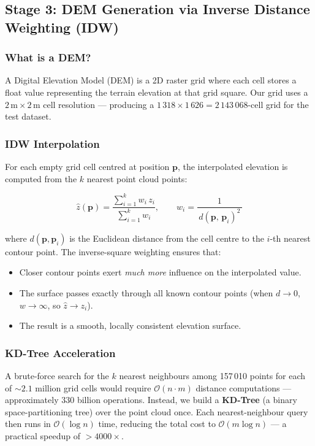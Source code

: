 \documentclass[12pt,a4paper]{article}
\begin{document}
\subsection{Stage 3: DEM Generation via Inverse Distance Weighting (IDW)}

\subsubsection{What is a DEM?}
A Digital Elevation Model (DEM) is a 2D raster grid where each cell stores a float
value representing the terrain elevation at that grid square. Our grid uses a
$2\,\text{m} \times 2\,\text{m}$ cell resolution --- producing a
$1\,318 \times 1\,626 = 2\,143\,068$-cell grid for the test dataset.

\subsubsection{IDW Interpolation}
For each empty grid cell centred at position $\mathbf{p}$, the interpolated elevation
is computed from the $k$ nearest point cloud points:

\begin{equation}
    \hat{z}(\mathbf{p}) = \frac{\displaystyle\sum_{i=1}^{k} w_i \, z_i}
                               {\displaystyle\sum_{i=1}^{k} w_i},
    \qquad w_i = \frac{1}{\,d(\mathbf{p},\,\mathbf{p}_i)^2\,}
\end{equation}

where $d(\mathbf{p}, \mathbf{p}_i)$ is the Euclidean distance from the cell centre to
the $i$-th nearest contour point. The inverse-square weighting ensures that:
\begin{itemize}
    \item Closer contour points exert \emph{much more} influence on the interpolated value.
    \item The surface passes exactly through all known contour points (when $d \to 0$,
          $w \to \infty$, so $\hat{z} \to z_i$).
    \item The result is a smooth, locally consistent elevation surface.
\end{itemize}

\subsubsection{KD-Tree Acceleration}
A brute-force search for the $k$ nearest neighbours among 157\,010 points for each of
$\sim 2.1$ million grid cells would require $\mathcal{O}(n \cdot m)$ distance
computations --- approximately $330$ billion operations. Instead, we build a
\textbf{KD-Tree} (a binary space-partitioning tree) over the point cloud once. Each
nearest-neighbour query then runs in $\mathcal{O}(\log n)$ time, reducing the total
cost to $\mathcal{O}(m \log n)$ --- a practical speedup of $>4000\times$.
\end{document}
